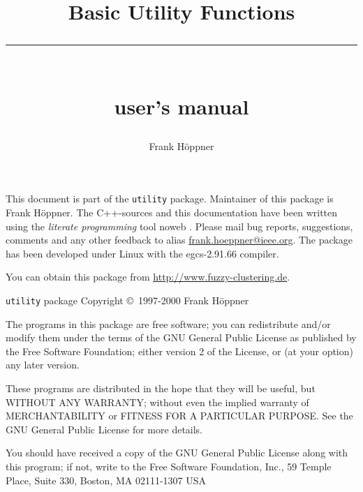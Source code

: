 \documentclass{book}
\newif\ifhackerdocs
\begin{document}



\thispagestyle{empty}

\title{Basic Utility Functions\\[-3mm]
\rule{12cm}{1mm}\\ 
{\normalsize\sc \ifhackerdocs developer's \else user's \fi manual}}
\author{Frank H\"oppner}

\maketitle


\newpage This document is part of the {\tt utility} package. Maintainer of
this package is Frank H\"oppner. The C++-sources and this documentation have
been written using the {\sl literate programming} tool noweb
\cite{Ramsey:TS:94, Ramsey:WWW:noweb}. Please mail bug reports, suggestions,
comments and any other feedback to alias \url{frank.hoeppner@ieee.org}. The
package has been developed under Linux with the egcs-2.91.66
compiler.

You can obtain this package from \url{http://www.fuzzy-clustering.de}.

{\tt utility} package Copyright \copyright\ 1997-2000 Frank H\"oppner

The programs in this package are free software; you can redistribute and/or
modify them under the terms of the GNU General Public License as published by
the Free Software Foundation; either version 2 of the License, or (at your
option) any later version.

These programs are distributed in the hope that they will be useful,
but WITHOUT ANY WARRANTY; without even the implied warranty of
MERCHANTABILITY or FITNESS FOR A PARTICULAR PURPOSE. See the GNU
General Public License for more details.

You should have received a copy of the GNU General Public License along with
this program; if not, write to the Free Software Foundation, Inc., 59 Temple
Place, Suite 330, Boston, MA 02111-1307 USA


\tableofcontents
\newpage



\cleardoublepage
\setcounter{page}{1}
\end{document}
